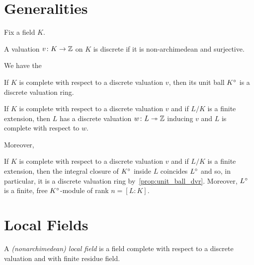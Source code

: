 \section{Generalities}
Fix a field $K$.
\begin{definition}
\label{def:discrete_val}
\leanok
A valuation $v\colon K \to \mathbb{Z}$ on $K$ is discrete if it is non-archimedean and surjective.
\end{definition}
We have the

\begin{proposition}
\label{prop:unit_ball_dvr}
If $K$ is complete with respect to a discrete valuation $v$, then its unit ball ${K}^\circ$ is a discrete valuation ring.
\end{proposition}

\begin{lemma} 
\label{lemma:val_L}
If $K$ is complete with respect to a discrete valuation $v$ and if $L/K$ is a finite extension, then $L$ has a discrete valuation $w\colon L \twoheadrightarrow \mathbb{Z}$ inducing $v$ and $L$ is complete with respect to $w$.
\end{lemma}

Moreover,
\begin{proposition}
\label{prop:unitball_L}
If $K$ is complete with respect to a discrete valuation $v$ and if $L/K$ is a finite extension, then the integral closure of ${K}^\circ$ inside $L$ coincides ${L}^\circ$ and so, in particular, it is a discrete valuation ring by~\ref{prop:unit_ball_dvr}. Moreover, ${L}^\circ$ is a finite, free ${K}^\circ$-module of rank $n=[L:K]$.
\end{proposition}
\section{Local Fields}
\begin{definition}
\label{local_field}
\leanok
A \textit{(nonarchimedean) local field} is a field complete with respect to a discrete
valuation and with finite residue field.
\end{definition}

